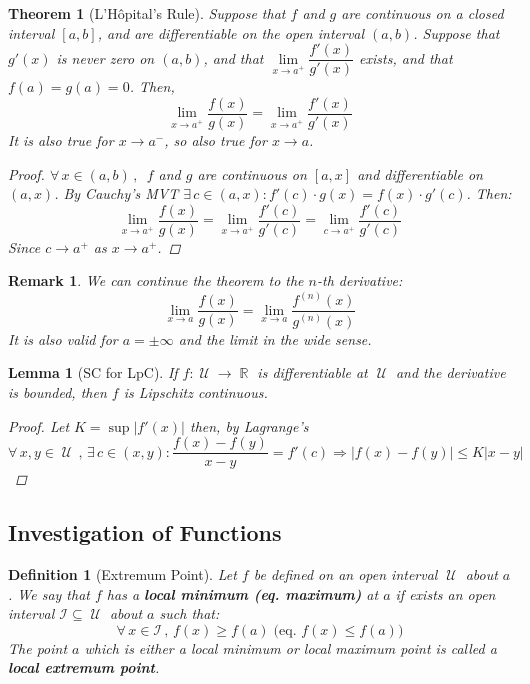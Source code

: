 \documentclass[12pt]{article}
\let\RA\Rightarrow
\newcommand{\Forall}[1]{\forall\,{#1}\,,\,}
\newcommand{\Exist}[1]{\exists\,{#1}:}
\DeclareMathOperator{\R}{\mathbb{R}}
\DeclareMathOperator{\U}{\mathcal{U}}
\newtheorem{theorem}{Theorem}[subsection]
\newtheorem{definition}{Definition}[subsection]
\newtheorem{lemma}{Lemma}[subsection]
\newtheorem{remark}{Remark}[subsection]
\begin{document}
\begin{theorem}[L'Hôpital's Rule]
  Suppose that $f$ and $g$ are continuous on a closed interval $[a, b]$, and are differentiable on the open interval $(a, b)$. Suppose that $g'(x)$ is never zero on $(a, b)$, and that $\lim\limits_{x\to a^{+}}\dfrac{f'(x)}{g'(x)}$ exists, and that $f(a)=g(a)=0$. Then, $$\lim\limits_{x\to a^{+}}\dfrac{f(x)}{g(x)}=\lim\limits_{x\to a^{+}}\dfrac{f'(x)}{g'(x)}$$
  It is also true for $x\to a^{-}$, so also true for $x\to a$.
  \begin{proof}
    $\Forall{x\in(a,b)}$ $f$ and $g$ are continuous on  $[a, x]$ and differentiable on $(a, x)$. By Cauchy's MVT $\Exist{c\in(a,x)} f'(c)\cdot g(x)=f(x)\cdot g'(c)$. Then: $$\lim\limits_{x\to a^{+}}\dfrac{f(x)}{g(x)}=\lim\limits_{x\to a^{+}}\dfrac{f'(c)}{g'(c)}=\lim\limits_{c\to a^{+}}\dfrac{f'(c)}{g'(c)}$$
    Since $c\to a^{+}$ as $x\to a^{+}$.
  \end{proof}
\end{theorem}

\begin{remark}
  We can continue the theorem to the $n$-th derivative:
  $$\lim_{x\to a}\frac{f(x)}{g(x)}=\lim_{x\to a}\frac{f^{(n)}(x)}{g^{(n)}(x)}$$
  It is also valid for $a=\pm\infty$ and the limit in the wide sense.
\end{remark}

\begin{lemma}[SC for LpC]
  If $f:\U\to\R$ is differentiable at $\U$ and the derivative is bounded, then $f$ is Lipschitz continuous.
  \begin{proof}
    Let $K=\sup|f'(x)|$ then, by Lagrange's $\Forall{x,y\in\U}\Exist{c\in(x,y)} \dfrac{f(x)-f(y)}{x-y}=f'(c)\RA |f(x)-f(y)|\leq K |x-y|$
  \end{proof}
\end{lemma}

\pagebreak

\subsection{Investigation of Functions}

\begin{definition}[Extremum Point]
  Let $f$ be defined on an open interval $\U$ about $a$. We say that $f$ has a \textbf{local minimum (eq. maximum)} at $a$ if exists an open interval $\mathcal{I}\subseteq \U$ about $a$ such that: $$\Forall{x\in \mathcal{I}} f(x)\geq f(a)\;\Big(\text{eq. }f(x)\leq f(a)\Big)$$ The point $a$ which is either a local minimum or local maximum point is called a \textbf{local extremum point}.
\end{definition}
\end{document}
